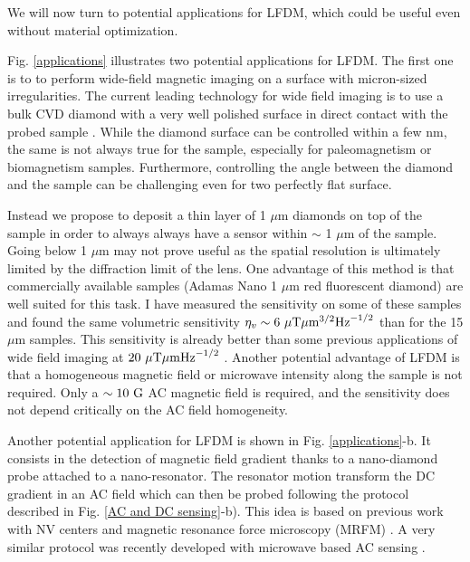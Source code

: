 \documentclass[a4paper, 11pt]{book}
\begin{document}
We will now turn to potential applications for LFDM, which could be useful even without material optimization.

Fig. \ref{applications} illustrates two potential applications for LFDM. The first one is to to perform wide-field magnetic imaging on a surface with micron-sized irregularities. The current leading technology for wide field imaging is to use a bulk CVD diamond with a very well polished surface in direct contact with the probed sample \citep{levine2019principles, scholten2021widefield}. While the diamond surface can be controlled within a few nm, the same is not always true for the sample, especially for paleomagnetism or biomagnetism samples. Furthermore, controlling the angle between the diamond and the sample can be challenging even for two perfectly flat surface. 

Instead we propose to deposit a thin layer of 1 $\mu$m diamonds on top of the sample in order to always always have a sensor within $\sim$ 1 $\mu$m of the sample. Going below 1 $\mu$m may not prove useful as the spatial resolution is ultimately limited by the diffraction limit of the lens. One advantage of this method is that commercially available samples (Adamas Nano 1 $\mu$m red fluorescent diamond) are well suited for this task. I have measured the sensitivity on some of these samples and found the same volumetric sensitivity $\eta_v \sim 6 \ \rm{\mu T}\mu \rm{m}^{3/2} \rm{Hz}^{-1/2}$ than for the 15 $\mu$m samples. This sensitivity is already better than some previous applications of wide field imaging at $20  \ \rm{\mu T}\mu \rm{m} \rm{Hz}^{-1/2}$ \citep{glenn2017micrometer}. Another potential advantage of LFDM is that a homogeneous magnetic field or microwave intensity along the sample is not required. Only a $\sim 10 \ \rm G$ AC magnetic field is required, and the sensitivity does not depend critically on the AC field homogeneity.

Another potential application for LFDM is shown in Fig. \ref{applications}-b. It consists in the detection of magnetic field gradient thanks to a nano-diamond probe attached to a nano-resonator. The resonator motion transform the DC gradient in an AC field which can then be probed following the protocol described in Fig. \ref{AC and DC sensing}-b). This idea is based on previous work with NV centers \citep{arcizet2011single} and magnetic resonance force microscopy (MRFM) \citep{rugar2004single}. A very similar protocol was recently developed with microwave based AC sensing \citep{huxter2022scanning}. 
\end{document}
